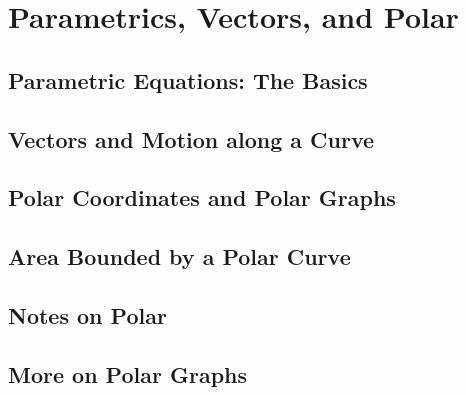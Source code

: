 \documentclass[../bccalc.tex]{subfiles}
\begin{document}
\chapter{Parametrics, Vectors, and Polar}
\section{Parametric Equations: The Basics}

\section{Vectors and Motion along a Curve}

\section{Polar Coordinates and Polar Graphs}

\section{Area Bounded by a Polar Curve}

\section{Notes on Polar}

\section{More on Polar Graphs}
\end{document}
